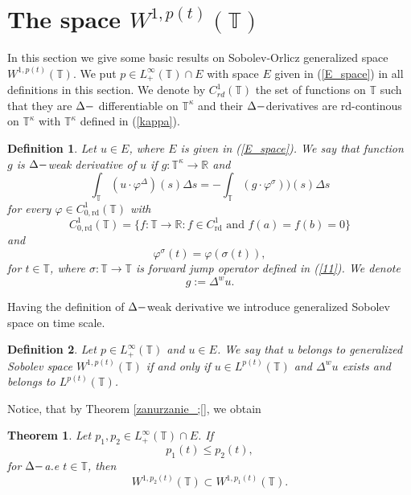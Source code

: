 \documentclass[12pt,a4paper,oneside,titlepage]{article}
\newtheorem{Twierdzenie}{Theorem}
\newtheorem{Def}{Definition}
\begin{document}
\newpage
\section{The space $W^{1,p(t)}(\mathbb{T})$}
In this section we give some basic results on Sobolev-Orlicz generalized space $W^{1,p(t)}(\mathbb{T})$. We put $p \in L^{\infty}_{+} \left( \mathbb{T} \right) \cap E $ with space $E$ given in (\ref{E_space}) in all definitions in this section.
We denote by
$C^1_{rd} ( \mathbb{T} )$   the set of functions on  $\mathbb{T} $ such that they are  $\Delta \--$ differentiable on  $\mathbb{T}^{\kappa}$  and their $\Delta \-- $derivatives are rd-continous on $ \mathbb{T}^{\kappa}$ with $\mathbb{T}^{\kappa}$ defined in (\ref{kappa}).  
\indent
\begin{Def} Let $u \in E$, where $E$ is given in (\ref{E_space}). We say that function $g$ is $\Delta \--$weak derivative of $u$ if  $g : \mathbb{T}^{\kappa} \rightarrow \mathbb{R}$ and 
\begin{equation}
\nonumber
\int_{\mathbb{T}} (u \cdot \varphi^{\Delta})(s) \Delta s = - \int_{\mathbb{T}} (g \cdot \varphi^{\sigma}))(s) \Delta s 
\end{equation}
for every $\varphi \in C^1_{0,\text{rd}}({\mathbb{T}})$ with
\begin{equation}
\nonumber
C^1_{0,\text{rd}}({\mathbb{T}}) = \lbrace f: {\mathbb{T}} \rightarrow \mathbb{R}: f \in C^1_{\text{rd}} \text{ and }  f(a)=f(b)=0 \rbrace
\end{equation}
and 
\begin{equation}
\nonumber
\varphi^{\sigma}(t)=\varphi(\sigma(t)),
\end{equation}
for $t \in \mathbb{T}$, where $\sigma:\mathbb{T} \rightarrow \mathbb{T}$ is forward jump operator defined in (\ref{11}). We denote
\begin{equation}
\nonumber
g:= \Delta^{w} u.
\end{equation}
\end{Def}
Having the definition of $\Delta \-- $weak derivative we introduce generalized Sobolev space on time scale.
\begin{Def} 
Let $p \in L_{+}^{\infty}(\mathbb{T}) $ and $u \in E $. We say that u belongs to generalized Sobolev space $W^{1,p(t)}({\mathbb{T}})$ if and only if $u \in L^{p(t)}(\mathbb{T})$ and $\Delta^{w}u$ exists and belongs to $ L^{p(t)}(\mathbb{T})$.
\end{Def}
Notice, that by Theorem \ref{zanurzanie_;[}, we obtain
\begin{Twierdzenie}
\label{W_p1_p2}
 Let $p_1, p_2 \in L^{\infty}_{+}(\mathbb{T})\cap E$. If 
\begin{equation}
\nonumber
p_1(t) \leq p_2(t), 
\end{equation}
for $\Delta \-- $a.e $t \in \mathbb{T}$, then
\begin{equation}
W^{1,p_2(t)}(\mathbb{T})\subset W^{1,p_1(t)}(\mathbb{T}).
\end{equation}
\end{Twierdzenie}
\end{document}
